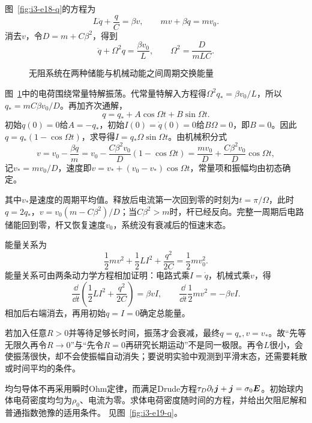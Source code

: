\begin{solution}
图~\ref{fig:i3-e18-q}的方程为
\[
L\ddot q+\frac qC=\beta v,\qquad mv+\beta q=mv_0.
\]
消去$v$，令$D=m+C\beta^2$，得到
\[
\ddot q+\Omega^2q=\frac{\beta v_0}{L},\qquad
\Omega^2=\frac{D}{mLC}.
\]

\begin{figure}[H]\centering
{}
\caption{无阻系统在两种储能与机械动能之间周期交换能量}\label{fig:i3-e18-s}
\end{figure}

图~\ref{fig:i3-e18-s}中的电荷围绕常量特解振荡。代常量特解入方程得$\Omega^2q_*=\beta v_0/L$，所以$q_*=mC\beta v_0/D$。再加齐次通解，
\[
q=q_*+A\cos\Omega t+B\sin\Omega t.
\]
初始$q(0)=0$给$A=-q_*$，初始$I(0)=\dot q(0)=0$给$B\Omega=0$，即$B=0$。因此$q=q_*(1-\cos\Omega t)$，求导得$I=q_*\Omega\sin\Omega t$。由机械积分式
\[
v=v_0-\frac{\beta q}{m}
=v_0-\frac{C\beta^2v_0}{D}(1-\cos\Omega t)
=\frac{mv_0}{D}+\frac{C\beta^2v_0}{D}\cos\Omega t,
\]
记$v_*=mv_0/D$，速度即$v=v_*+(v_0-v_*)\cos\Omega t$，常量项和振幅均由初态确定。

其中$v_*$是速度的周期平均值。释放后电流第一次回到零的时刻为$t=\pi/\Omega$，此时$q=2q_*$，$v=v_0(m-C\beta^2)/D$；当$C\beta^2>m$时，杆已经反向。完整一周期后电路储能回到零，杆又恢复速度$v_0$，系统没有衰减后的恒速末态。

能量关系为
\[
\frac12mv^2+\frac12LI^2+\frac{q^2}{2C}=\frac12mv_0^2.
\]
能量关系可由两条动力学方程相加证明：电路式乘$I=\dot q$，机械式乘$v$，得
\[
\frac{\dd}{\dd t}\left(\frac12LI^2+\frac{q^2}{2C}\right)
=\beta vI,\qquad
\frac{\dd}{\dd t}\frac12mv^2=-\beta vI.
\]
相加后右端消去，再用初始$q=I=0$确定总能量。

若加入任意$R>0$并等待足够长时间，振荡才会衰减，最终$q=q_*,v=v_*$。故“先等无限久再令$R\to0$”与“先令$R=0$再研究长期运动”不是同一极限。再令$L$很小，会使振荡很快，却不会使振幅自动消失；要说明实验中观测到平滑末态，还需要耗散或时间平均的条件。
\end{solution}

\begin{example}[载流子惯性对电荷弛豫的修正（选做）]\label{ex:i3-e19}

均匀导体不再采用瞬时Ohm定律，而满足Drude方程$\tau_D\partial_t\bm{j}+\bm{j}=\sigma_0\bm{E}$。初始球内体电荷密度均匀为$\rho_0$、电流为零。求体电荷密度随时间的方程，并给出欠阻尼解和普通指数弛豫的适用条件。
 见图~\ref{fig:i3-e19-q}。
\end{example}

